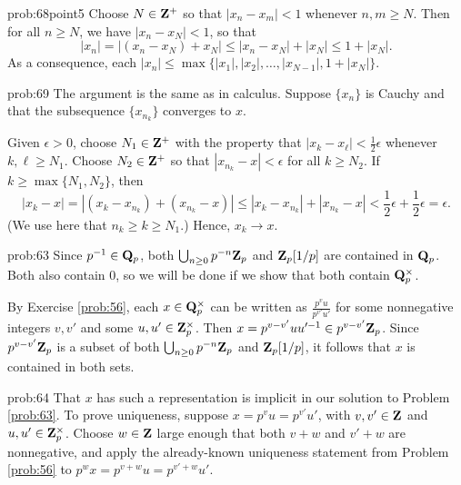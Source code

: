 \begin{sol}{prob:68point5} Choose $N \in \mathbf{Z}^{+}$ so that $|x_n-x_m| < 1$ whenever $n, m \ge N$. Then for all $n \ge N$, we have $|x_n-x_N| < 1$, so that \[ |x_n| = |(x_n-x_N) + x_N| \le |x_n-x_N| + |x_N| \le 1 + |x_N|. \]
As a consequence, each $|x_n| \le \max\{|x_1|,|x_2|,\dots,|x_{N-1}|,1+|x_N|\}$.
\end{sol}

\begin{sol}{prob:69} The argument is the same as in calculus. Suppose $\{x_n\}$ is Cauchy and that the subsequence $\{x_{n_k}\}$ converges to $x$. 

Given $\epsilon > 0$, choose $N_1 \in \mathbf{Z}^{+}$ with the property that $|x_k - x_\ell| < \frac{1}{2}\epsilon$ whenever $k,\ell \ge N_1$. Choose $N_2 \in \mathbf{Z}^{+}$ so that $|x_{n_k} - x| < \epsilon$ for all $k \ge N_2$. If $k \ge \max\{N_1, N_2\}$, then
\[ |x_k - x| = |(x_k - x_{n_k}) + (x_{n_k}-x)| \le |x_k - x_{n_k}| + |x_{n_k}-x| < \frac{1}{2}\epsilon + \frac{1}{2}\epsilon = \epsilon. \]
(We use here that $n_k \ge k \ge N_1$.) Hence, $x_k\to x$.
 \end{sol}



\begin{sol}{prob:63} Since $p^{-1} \in \mathbf{Q}_p$, both $\bigcup_{n\ge 0} p^{-n}\mathbf{Z}_p$ and $\mathbf{Z}_p[1/p]$ are contained in $\mathbf{Q}_p$. Both also contain $0$, so we will be done if we show that both contain $\mathbf{Q}_p^{\times}$. 

By Exercise \ref{prob:56}, each $x\in \mathbf{Q}_p^{\times}$ can be written as $\frac{p^v u}{p^{v'} u'}$ for some nonnegative integers $v,v'$ and some $u,u' \in \mathbf{Z}_p^{\times}$. Then $x = p^{v-v'} uu'^{-1} \in p^{v-v'}\mathbf{Z}_p$. Since $p^{v-v'}\mathbf{Z}_p$ is a subset of both $\bigcup_{n\ge 0} p^{-n} \mathbf{Z}_p$ and $\mathbf{Z}_p[1/p]$, it follows that $x$ is contained in both sets.
\end{sol}

\begin{sol}{prob:64}  That $x$ has such a representation is implicit in our solution to Problem \ref{prob:63}. To prove uniqueness, suppose $x=p^{v} u = p^{v'} u'$, with $v,v'\in \mathbf{Z}$ and $u, u' \in \mathbf{Z}_p^{\times}$. Choose $w \in \mathbf{Z}$ large enough that both $v+w$ and $v'+w$ are nonnegative, and apply the already-known uniqueness statement from Problem \ref{prob:56} to $p^w x = p^{v+w} u = p^{v'+w} u'$.
\end{sol}

